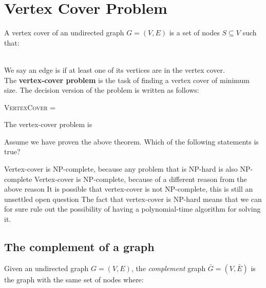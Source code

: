 \documentclass[11  pt]{article}
\begin{document}
	
	
\section{Vertex Cover Problem}
A vertex cover of an undirected graph $G = (V,E)$ is a set of nodes $S \subseteq V$ such that:\\ \\


\vs{2cm}

We say an edge is  if at least one of its vertices are in the vertex cover. \\

The \textbf{vertex-cover problem} is the task of finding a vertex cover of minimum size. The decision version of the problem is written as follows:

\begin{center}
	\textsc{VertexCover} = \phantom{$\langle G,k \rangle \colon $ more more more more more more more more} 
\end{center}		





\newpage
\begin{theorem}
	The vertex-cover problem is 
\end{theorem}
\vs{1cm}
\begin{Qu}
	Assume we have proven the above theorem. Which of the following statements is true?
	\begin{itemize}
		\aitem Vertex-cover is NP-complete, because any problem that is NP-hard is also NP-complete
		\bitem Vertex-cover is NP-complete, because of a different reason from the above reason
		\citem It is possible that vertex-cover is not NP-complete, this is still an unsettled open question
		\ditem The fact that vertex-cover is NP-hard means that we can for sure rule out the possibility of having a polynomial-time algorithm for solving it.
	\end{itemize}	
	
\end{Qu}

\newpage
\subsection*{The complement of a graph}
Given an undirected graph $G = (V,E)$, the \emph{complement} graph $\bar{G} = (V,\bar{E})$ is the graph with the same set of nodes where:
\end{document}
